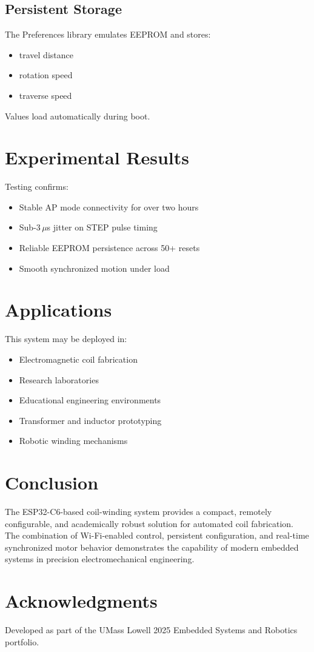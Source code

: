 \documentclass[12pt]{article}
\begin{document}
\subsection{Persistent Storage}

The Preferences library emulates EEPROM and stores:
\begin{itemize}
    \item travel distance
    \item rotation speed
    \item traverse speed
\end{itemize}

Values load automatically during boot.

\section{Experimental Results}

Testing confirms:
\begin{itemize}
    \item Stable AP mode connectivity for over two hours
    \item Sub-3\,$\mu$s jitter on STEP pulse timing
    \item Reliable EEPROM persistence across 50+ resets
    \item Smooth synchronized motion under load
\end{itemize}

\section{Applications}

This system may be deployed in:
\begin{itemize}
    \item Electromagnetic coil fabrication
    \item Research laboratories
    \item Educational engineering environments
    \item Transformer and inductor prototyping
    \item Robotic winding mechanisms
\end{itemize}

\section{Conclusion}

The ESP32-C6-based coil-winding system provides a compact, remotely configurable, and academically robust solution for automated coil fabrication. The combination of Wi-Fi-enabled control, persistent configuration, and real-time synchronized motor behavior demonstrates the capability of modern embedded systems in precision electromechanical engineering.

\section*{Acknowledgments}
Developed as part of the UMass Lowell 2025 Embedded Systems and Robotics portfolio.
\end{document}

